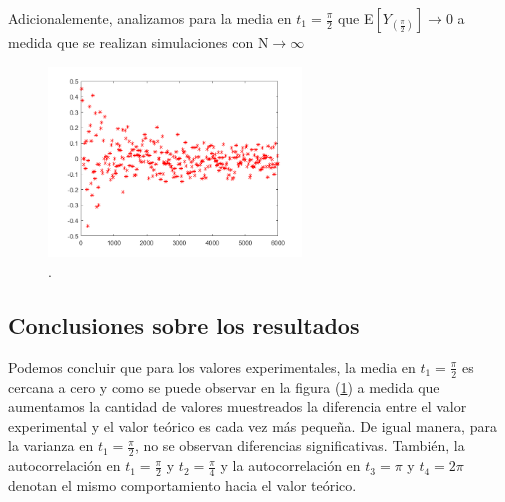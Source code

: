 Adicionalemente, analizamos para la media en $t_1 = \frac{\pi}{2}$ que E$\left[ Y_{(\frac{\pi}{2})}\right]\rightarrow 0$ a medida que se realizan simulaciones con N$\rightarrow \infty$
\begin{figure}[H]
\centering
	\includegraphics[width=0.6\textwidth, trim = {0 0 0 0},clip]{./ImagenesEjercicio1/media.png}
	\caption{.}
	\label{fig:media}
\end{figure}

\subsection{Conclusiones sobre los resultados}

Podemos concluir que para los valores experimentales, la media en $t_1 = \frac{\pi}{2}$ es cercana a cero y como se puede observar en la figura (\ref{fig:media}) a medida que aumentamos la cantidad de valores muestreados la diferencia entre el valor experimental y el valor teórico es cada vez más pequeña. De igual manera, para la varianza en $t_1 = \frac{\pi}{2}$, no se observan diferencias significativas.
También, la autocorrelación en $t_1 = \frac{\pi}{2}$ y $t_2 = \frac{\pi}{4}$ y la autocorrelación en $t_3 = \pi$ y $t_4 = 2\pi$ denotan el mismo comportamiento hacia el valor teórico. 






